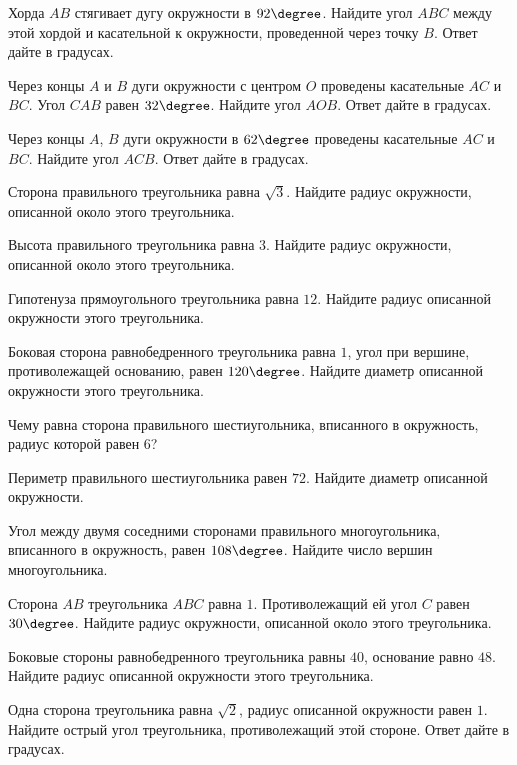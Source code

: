 \begin{class}[number=6]
	\begin{listofex}
		\item Хорда \( AB \) стягивает дугу окружности в \( 92\degree \). Найдите угол \( ABC \) между этой хордой и касательной к окружности, проведенной через точку \( B \). Ответ дайте в градусах.
		\item Через концы \( A \) и \( B \) дуги окружности с центром \( O \) проведены касательные \( AC \) и \( BC \). Угол \( CAB \) равен \( 32\degree \). Найдите угол \( AOB \). Ответ дайте в градусах.
		\item Через концы \( A \), \( B \) дуги окружности в \( 62\degree \) проведены касательные \( AC \) и \( BC \). Найдите угол \( ACB \). Ответ дайте в градусах.
		\item Сторона правильного треугольника равна \( \sqrt{3} \). Найдите радиус окружности, описанной около этого треугольника.
		\item Высота правильного треугольника равна \( 3 \). Найдите радиус окружности, описанной около этого треугольника.
		\item Гипотенуза прямоугольного треугольника равна \( 12 \). Найдите радиус описанной окружности этого треугольника.
		\item Боковая сторона равнобедренного треугольника равна \( 1 \), угол при вершине, противолежащей основанию, равен \( 120\degree \). Найдите диаметр описанной окружности этого треугольника.
		\item Чему равна сторона правильного шестиугольника, вписанного в окружность, радиус которой равен \( 6 \)?
		\item Периметр правильного шестиугольника равен \( 72 \). Найдите диаметр описанной окружности.
		\item Угол между двумя соседними сторонами правильного многоугольника, вписанного в окружность, равен \( 108\degree \). Найдите число вершин многоугольника.
		\item Сторона \( AB \) треугольника \( ABC \) равна \( 1 \). Противолежащий ей угол \( C \) равен \( 30\degree \). Найдите радиус окружности, описанной около этого треугольника.
		\item Боковые стороны равнобедренного треугольника равны \( 40 \), основание равно \( 48 \). Найдите радиус описанной окружности этого треугольника.
		\item Одна сторона треугольника равна \( \sqrt{2} \), радиус описанной окружности равен \( 1 \). Найдите острый угол треугольника, противолежащий этой стороне. Ответ дайте в градусах.
	\end{listofex}
\end{class}

